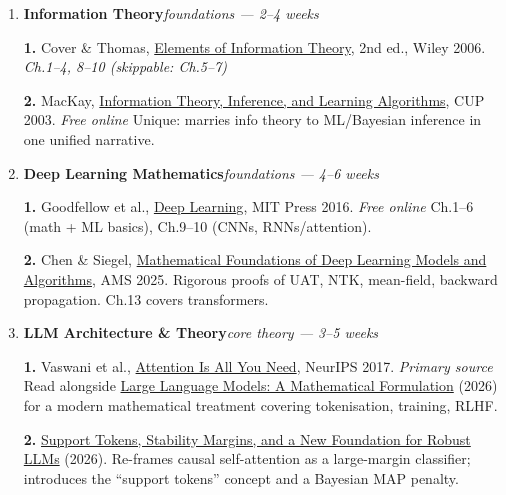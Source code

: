 \documentclass[11pt,a4paper]{article}
\begin{document}
\begin{enumerate}[leftmargin=2em,label=\textbf{Step \arabic*:},itemsep=0.7cm]

	\item \textbf{Information Theory}\hfill\textit{foundations --- 2--4 weeks}

	      \textbf{1.} Cover \& Thomas, \href{https://www.wiley.com/en-us/Elements+of+Information+Theory\%2C+2nd+Edition-p-9780471241959}{Elements of Information Theory}, 2nd ed., Wiley 2006.
	      \hfill\textit{Ch.1--4, 8--10 (skippable: Ch.5--7)}

	      \textbf{2.} MacKay, \href{https://www.inference.org.uk/mackay/itila/}{Information Theory, Inference, and Learning Algorithms}, CUP 2003. \hfill\textit{Free online}
	      \newline \qquad Unique: marries info theory to ML/Bayesian inference in one unified narrative.

	\item \textbf{Deep Learning Mathematics}\hfill\textit{foundations --- 4--6 weeks}

	      \textbf{1.} Goodfellow et al., \href{https://www.deeplearningbook.org/}{Deep Learning}, MIT Press 2016. \hfill\textit{Free online}
	      \newline \qquad Ch.1--6 (math + ML basics), Ch.9--10 (CNNs, RNNs/attention).

	      \textbf{2.} Chen \& Siegel, \href{https://mathdl.github.io/}{Mathematical Foundations of Deep Learning Models and Algorithms}, AMS 2025.
	      \newline \qquad Rigorous proofs of UAT, NTK, mean-field, backward propagation. Ch.13 covers transformers.

	\item \textbf{LLM Architecture \& Theory}\hfill\textit{core theory --- 3--5 weeks}

	      \textbf{1.} Vaswani et al., \href{https://arxiv.org/abs/1706.03762}{Attention Is All You Need}, NeurIPS 2017. \hfill\textit{Primary source}
	      \newline \qquad Read alongside \href{https://arxiv.org/abs/2601.22170}{Large Language Models: A Mathematical Formulation}
	      (2026) for a modern mathematical treatment covering tokenisation, training, RLHF.

	      \textbf{2.} \href{https://arxiv.org/abs/2602.22271}{Support Tokens, Stability Margins, and a New Foundation for Robust LLMs} (2026).
	      \newline \qquad Re-frames causal self-attention as a large-margin classifier; introduces the ``support tokens'' concept and a Bayesian MAP penalty.


\end{enumerate}
\end{document}
